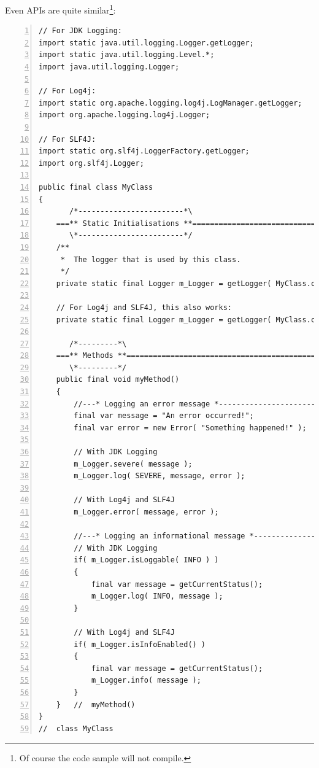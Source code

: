 \documentclass[11pt,a4paper, titlepage, parskip=half, headsepline, footsepline, cleardoublepage=current, headheight=1cm]{scrbook}
\begin{document}
Even APIs are quite similar\footnote{Of course the code sample will not compile.}: 
\begin{lstlisting}[numbers=left]
// For JDK Logging:
import static java.util.logging.Logger.getLogger;
import static java.util.logging.Level.*; 
import java.util.logging.Logger;

// For Log4j:
import static org.apache.logging.log4j.LogManager.getLogger;
import org.apache.logging.log4j.Logger;

// For SLF4J:
import static org.slf4j.LoggerFactory.getLogger;
import org.slf4j.Logger;

public final class MyClass
{
       /*------------------------*\
    ===** Static Initialisations **==================================
       \*------------------------*/
    /**
     *  The logger that is used by this class.
     */
    private static final Logger m_Logger = getLogger( MyClass.class.getName() );
    
    // For Log4j and SLF4J, this also works:
    private static final Logger m_Logger = getLogger( MyClass.class );
    
       /*---------*\
    ===** Methods **=================================================
       \*---------*/
    public final void myMethod()
    {
        //---* Logging an error message *----------------------------
        final var message = "An error occurred!";
        final var error = new Error( "Something happened!" );
        
        // With JDK Logging
        m_Logger.severe( message );
        m_Logger.log( SEVERE, message, error );
        
        // With Log4j and SLF4J
        m_Logger.error( message, error );

        //---* Logging an informational message *--------------------
        // With JDK Logging
        if( m_Logger.isLoggable( INFO ) )
        {
            final var message = getCurrentStatus();
            m_Logger.log( INFO, message );
        }
        
        // With Log4j and SLF4J
        if( m_Logger.isInfoEnabled() )
        {
            final var message = getCurrentStatus();
            m_Logger.info( message );
        }
    }   //  myMethod()
}
//  class MyClass
\end{lstlisting}
\end{document}
